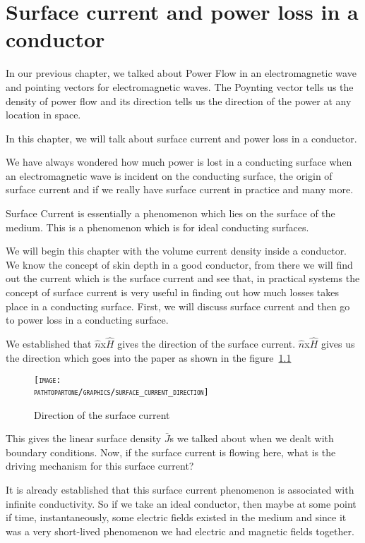 \chapter{Surface current and power loss in a conductor}\label{lec:lec28}
In our previous chapter, we talked about Power Flow in an electromagnetic wave and pointing vectors for electromagnetic waves. The Poynting vector tells us the density of power flow and its direction tells us the direction of the power at any location in space.

In this chapter, we will talk about surface current and power loss in a conductor.

We have always wondered how much power is lost in a conducting surface when an electromagnetic wave is incident on the conducting surface, the origin of surface current and if we really have surface current in practice and many more.

Surface Current is essentially a phenomenon which lies on the surface of the medium. This is a phenomenon which is for ideal conducting surfaces.

We will begin this chapter with the volume current density inside a conductor. We know the concept of skin depth in a good conductor, from there we will find out the current which is the surface current and see that, in practical systems the concept of surface current is very useful in finding out how much losses takes place in a conducting surface. First, we will discuss surface current and then go to power loss in a conducting surface.

We established that $\hat{n}$x$\hat{H}$ gives the direction of the surface current. $\hat{n}$x$\hat{H}$ gives us the direction which goes into the paper as shown in the figure~\ref{fig:direction_of_surface_current}
\begin{figure}[h]
\centering
\textsc{\texttt{[image: \\pathtopartone/graphics/surface\_current\_direction]}}
\caption{Direction of the surface current}
\label{fig:direction_of_surface_current}
\end{figure}

This gives the linear surface density $\bar{J}$s we talked about when we dealt with boundary conditions. Now, if the surface current is flowing here, what is the driving mechanism for this surface current?

It is already established that this surface current phenomenon is associated with infinite conductivity. So if we take an ideal conductor, then maybe at some point if time, instantaneously, some electric fields existed in the medium and since it was a very short-lived phenomenon we had electric and magnetic fields together.

